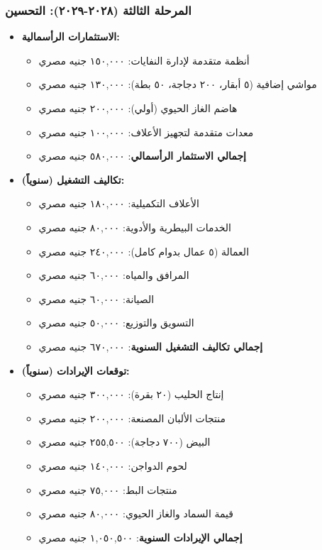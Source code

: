 \subsubsection{المرحلة الثالثة (٢٠٢٨-٢٠٢٩): التحسين}
\begin{itemize}
    \item \textbf{الاستثمارات الرأسمالية:}
    \begin{itemize}
        \item أنظمة متقدمة لإدارة النفايات: ١٥٠,٠٠٠ جنيه مصري
        \item مواشي إضافية (٥ أبقار، ٢٠٠ دجاجة، ٥٠ بطة): ١٣٠,٠٠٠ جنيه مصري
        \item هاضم الغاز الحيوي (أولي): ٢٠٠,٠٠٠ جنيه مصري
        \item معدات متقدمة لتجهيز الأعلاف: ١٠٠,٠٠٠ جنيه مصري
        \item \textbf{إجمالي الاستثمار الرأسمالي}: ٥٨٠,٠٠٠ جنيه مصري
    \end{itemize}
    
    \item \textbf{تكاليف التشغيل (سنوياً):}
    \begin{itemize}
        \item الأعلاف التكميلية: ١٨٠,٠٠٠ جنيه مصري
        \item الخدمات البيطرية والأدوية: ٨٠,٠٠٠ جنيه مصري
        \item العمالة (٥ عمال بدوام كامل): ٢٤٠,٠٠٠ جنيه مصري
        \item المرافق والمياه: ٦٠,٠٠٠ جنيه مصري
        \item الصيانة: ٦٠,٠٠٠ جنيه مصري
        \item التسويق والتوزيع: ٥٠,٠٠٠ جنيه مصري
        \item \textbf{إجمالي تكاليف التشغيل السنوية}: ٦٧٠,٠٠٠ جنيه مصري
    \end{itemize}
    
    \item \textbf{توقعات الإيرادات (سنوياً):}
    \begin{itemize}
        \item إنتاج الحليب (٢٠ بقرة): ٣٠٠,٠٠٠ جنيه مصري
        \item منتجات الألبان المصنعة: ٢٠٠,٠٠٠ جنيه مصري
        \item البيض (٧٠٠ دجاجة): ٢٥٥,٥٠٠ جنيه مصري
        \item لحوم الدواجن: ١٤٠,٠٠٠ جنيه مصري
        \item منتجات البط: ٧٥,٠٠٠ جنيه مصري
        \item قيمة السماد والغاز الحيوي: ٨٠,٠٠٠ جنيه مصري
        \item \textbf{إجمالي الإيرادات السنوية}: ١,٠٥٠,٥٠٠ جنيه مصري
    \end{itemize}
    

\end{itemize}
